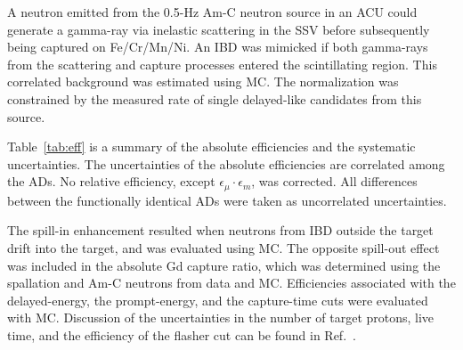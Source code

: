 \documentclass[aps,prl,showpacs,showkeys,amsmath,amssymb,
twocolumn,
floatfix,
superscriptaddress
]{revtex4-1}
\begin{document}
\par
A neutron emitted from the 0.5-Hz Am-C neutron source in an ACU could
generate a gamma-ray via inelastic scattering in the SSV before subsequently being captured on Fe/Cr/Mn/Ni.
An IBD was mimicked if both gamma-rays from the scattering
and capture processes entered the scintillating region.
This correlated background was estimated
using MC\@.  The normalization was constrained by the measured rate of single delayed-like candidates from this source.


\par
Table~\ref{tab:eff} is a summary of the absolute efficiencies and the systematic uncertainties. The uncertainties of the absolute efficiencies are correlated among the ADs. No relative efficiency, except $\epsilon_\mu\cdot\epsilon_m$, was corrected. All differences between the functionally identical ADs were taken as uncorrelated uncertainties.

\par
The spill-in enhancement resulted when neutrons from IBD outside the target drift into the target, and was evaluated using MC\@. The opposite spill-out effect was included in the absolute Gd capture ratio, which was determined using the spallation and Am-C neutrons from data and MC\@. Efficiencies associated with the delayed-energy, the prompt-energy, and the capture-time cuts were evaluated with MC\@. Discussion of the uncertainties in the number of target protons, live time, and the efficiency of the flasher cut can be found in Ref.~\cite{ad12}.
\end{document}
